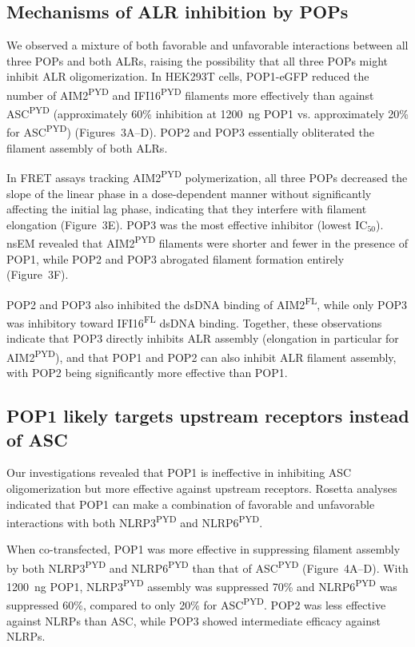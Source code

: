 \documentclass[11pt]{article}
\begin{document}
\subsection{Mechanisms of ALR inhibition by POPs}

We observed a mixture of both favorable and unfavorable interactions between all three POPs and both ALRs, raising the possibility that all three POPs might inhibit ALR oligomerization. In HEK293T cells, POP1-eGFP reduced the number of AIM2\textsuperscript{PYD} and IFI16\textsuperscript{PYD} filaments more effectively than against ASC\textsuperscript{PYD} (approximately 60\% inhibition at 1200~ng POP1 vs. approximately 20\% for ASC\textsuperscript{PYD}) (Figures~3A--D). POP2 and POP3 essentially obliterated the filament assembly of both ALRs.

In FRET assays tracking AIM2\textsuperscript{PYD} polymerization, all three POPs decreased the slope of the linear phase in a dose-dependent manner without significantly affecting the initial lag phase, indicating that they interfere with filament elongation (Figure~3E). POP3 was the most effective inhibitor (lowest IC$_{50}$). nsEM revealed that AIM2\textsuperscript{PYD} filaments were shorter and fewer in the presence of POP1, while POP2 and POP3 abrogated filament formation entirely (Figure~3F).

POP2 and POP3 also inhibited the dsDNA binding of AIM2\textsuperscript{FL}, while only POP3 was inhibitory toward IFI16\textsuperscript{FL} dsDNA binding. Together, these observations indicate that POP3 directly inhibits ALR assembly (elongation in particular for AIM2\textsuperscript{PYD}), and that POP1 and POP2 can also inhibit ALR filament assembly, with POP2 being significantly more effective than POP1.

\subsection{POP1 likely targets upstream receptors instead of ASC}

Our investigations revealed that POP1 is ineffective in inhibiting ASC oligomerization but more effective against upstream receptors. Rosetta analyses indicated that POP1 can make a combination of favorable and unfavorable interactions with both NLRP3\textsuperscript{PYD} and NLRP6\textsuperscript{PYD}.

When co-transfected, POP1 was more effective in suppressing filament assembly by both NLRP3\textsuperscript{PYD} and NLRP6\textsuperscript{PYD} than that of ASC\textsuperscript{PYD} (Figure~4A--D). With 1200~ng POP1, NLRP3\textsuperscript{PYD} assembly was suppressed 70\% and NLRP6\textsuperscript{PYD} was suppressed 60\%, compared to only 20\% for ASC\textsuperscript{PYD}. POP2 was less effective against NLRPs than ASC, while POP3 showed intermediate efficacy against NLRPs.
\end{document}
